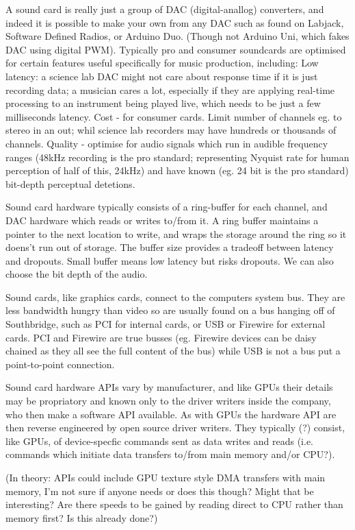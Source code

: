 \documentclass[oneside,english]{scrbook}
\begin{document}
A sound card is really just a group of DAC (digital-anallog) converters, and indeed it is possible to make your own from any DAC such as found on Labjack, Software Defined Radios, or Arduino Duo. (Though not Arduino Uni, which fakes DAC using digital PWM).   Typically pro and consumer soundcards are optimised for certain features useful specifically for music production, including:
Low latency: a science lab DAC might not care about response time if it is just recording data; a musician cares a lot, especially if they are applying real-time processing to an instrument being played live, which needs to be just a few milliseconds latency.
Cost - for consumer cards. Limit number of channels eg. to stereo in an out; whil science lab recorders may have hundreds or thousands of channels.
Quality - optimise for audio signals which run in audible frequency ranges (48kHz recording is the pro standard; representing Nyquist rate for human perception of half of this, 24kHz) and have known (eg. 24 bit is the pro standard) bit-depth perceptual detetions.

Sound card hardware typically consists of a ring-buffer for each channel, and DAC hardware which reads or writes to/from it. A ring buffer maintains a pointer to the next location to write, and wraps the storage around the ring so it doens't run out of storage. The buffer size provides a tradeoff between latency and dropouts. Small buffer means low latency but risks dropouts.  We can also choose the bit depth of the audio.

Sound cards, like graphics cards, connect to the computers system bus. They are less bandwidth hungry than video so are usually found on a bus hanging off of Southbridge, such as PCI for internal cards, or USB or Firewire for external cards.  PCI and Firewire are true busses (eg. Firewire devices can be daisy chained as they all see the full content of the bus) while USB is not a bus put a point-to-point connection.

Sound card hardware APIs vary by manufacturer, and like GPUs their details may be propriatory and known only to the driver writers inside the company, who then make a software API available. As with GPUs the hardware API are then reverse engineered by open source driver writers.  They typically (?) consist, like GPUs, of device-specfic commands sent as data writes and reads (i.e. commands which initiate data transfers to/from main memory and/or CPU?).

(In theory: APIs could include GPU texture style DMA transfers with main memory, I'm not sure if anyone needs or does this though? Might that be interesting?  Are there speeds to be gained by reading direct to CPU rather than memory first? Is this already done?)
\end{document}
